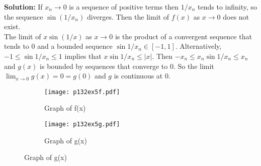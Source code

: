 \documentclass{article}
\newcommand{\solution}[1]{\setlength{\hangindent}{\parindent} \indent\indent \textbf{Solution: }#1\hfill\break}
\begin{document}
\solution{If $x_n\to 0$ is a sequence of positive terms then $1/x_n$ tends to infinity, so the sequence $\sin(1/x_n)$ diverges. Then the limit of $f(x)$ as $x\to 0$ does not exist. \\
\indent The limit of $x\sin(1/x)$ as $x\to 0$ is the product of a convergent sequence that tends to 0 and a bounded sequence $\sin 1/x_n \in [-1, 1]$. Alternatively, $-1\leq \sin 1/x_n \leq 1$ implies that $x\sin1/x_n \leq |x|$. Then $-x_n \leq x_n\sin1/x_n\leq x_n$ and $g(x)$ is bounded by sequences that converge to 0. So the limit $\lim_{x\to 0} g(x) = 0 = g(0)$ and $g$ is continuous at 0. %
\begin{figure}[h!]
	\centering
	\begin{subfigure}[b]{0.4\linewidth}
		\texttt{[image: p132ex5f.pdf]}
		\caption{Graph of f(x)}
	\end{subfigure}
	\begin{subfigure}[b]{0.4\linewidth}
		\texttt{[image: p132ex5g.pdf]}
		\caption{Graph of g(x)}
	\end{subfigure}
	\label{fig:p132ex5}
\end{figure}}

\newpage
\end{document}
